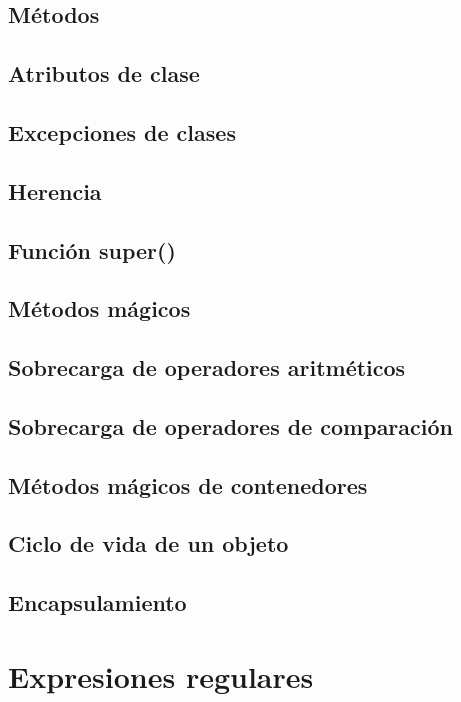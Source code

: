 \documentclass{article}
\begin{document}
\subsection{Métodos}

\subsection{Atributos de clase}

\subsection{Excepciones de clases}

\subsection{Herencia}

\subsection{Función super()}

\subsection{Métodos mágicos}

\subsection{Sobrecarga de operadores aritméticos}

\subsection{Sobrecarga de operadores de comparación}

\subsection{Métodos mágicos de contenedores}

\subsection{Ciclo de vida de un objeto}

\subsection{Encapsulamiento}

\section{Expresiones regulares}
\end{document}
